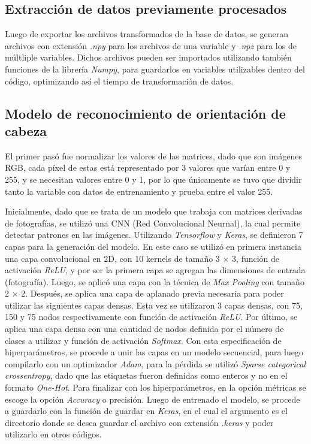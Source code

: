 \subsection{Extracción de datos previamente procesados}
Luego de exportar los archivos transformados de la base de datos, se generan archivos con extensión \textit{.npy} para los archivos de una variable y \textit{.npz} para los de múltliple variables. Dichos archivos pueden ser importados utilizando también funciones de la librería \textit{Numpy}, para guardarlos en variables utilizables dentro del código, optimizando así el tiempo de transformación de datos.

\subsection{Modelo de reconocimiento de orientación de cabeza}
El primer pasó fue normalizar los valores de las matrices, dado que son imágenes RGB, cada píxel de estas está representado por 3 valores que varían entre 0 y 255, y se necesitan valores entre 0 y 1, por lo que únicamente se tuvo que dividir tanto la variable con datos de entrenamiento y prueba entre el valor 255. 

Inicialmente, dado que se trata de un modelo que trabaja con matrices derivadas de fotografías, se utilizó una CNN (Red Convolucional Neurnal), la cual permite detectar patrones en las imágenes. Utilizando \textit{Tensorflow} y \textit{Keras}, se definieron 7 capas para la generación del modelo. En este caso se utilizó en primera instancia una capa convolucional en 2D, con 10 kernels de tamaño 3 $\times$ 3, función de activación \textit{ReLU}, y por ser la primera capa se agregan las dimensiones de entrada (fotografía). Luego, se aplicó una capa con la técnica de \textit{Max Pooling} con tamaño 2 $\times$ 2. Después, se aplica una capa de aplanado previa necesaria para poder utilizar las siguientes capas densas. Esta vez se utilizaron 3 capas densas, con 75, 150 y 75 nodos respectivamente con función de activación \textit{ReLU}. Por último, se aplica una capa densa con una cantidad de nodos definida por el número de clases a utilizar y función de activación \textit{Softmax}. Con esta especificación de hiperparámetros, se procede a unir las capas en un modelo secuencial, para luego compilarlo con un optimizador \textit{Adam}, para la pérdida se utilizó \textit{Sparse categorical crossentropy}, dado que las etiquetas fueron definidas como enteros y no en el formato \textit{One-Hot}. Para finalizar con los hiperparámetros, en la opción métricas se escoge la opción \textit{Accuracy} o precisión. Luego de entrenado el modelo, se procede a guardarlo con la función de guardar en \textit{Keras}, en el cual el argumento es el directorio donde se desea guardar el archivo con extensión \textit{.keras} y poder utilizarlo en otros códigos.

